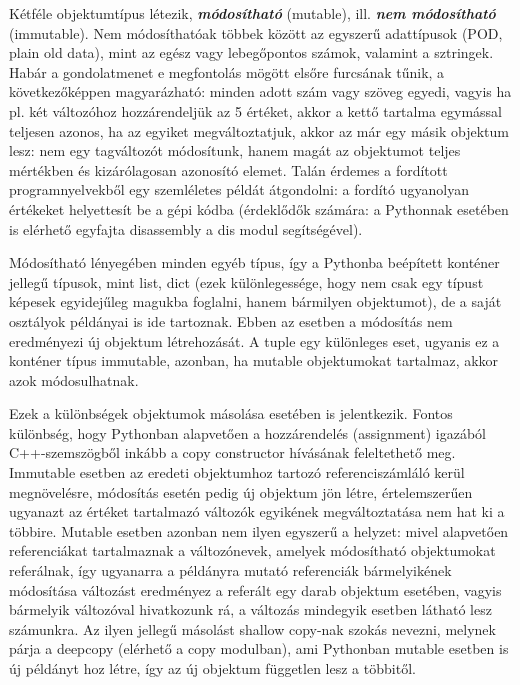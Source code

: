 \documentclass[12pt,a4paper,oneside]{report}             %
\begin{document}
Kétféle objektumtípus létezik, \textbf{\textit{módosítható}} (mutable), ill. \textbf{\textit{nem módosítható}} (immutable). Nem módosíthatóak többek között az egyszerű adattípusok (POD, plain old data), mint az egész vagy lebegőpontos számok, valamint a sztringek. Habár a gondolatmenet e megfontolás mögött elsőre furcsának tűnik, a következőképpen magyarázható: minden adott szám vagy szöveg egyedi, vagyis ha pl. két változóhoz hozzárendeljük az 5 értéket, akkor a kettő tartalma egymással teljesen azonos, ha az egyiket megváltoztatjuk, akkor az már egy másik objektum lesz: nem egy tagváltozót módosítunk, hanem magát az objektumot teljes mértékben és kizárólagosan azonosító elemet. Talán érdemes a fordított programnyelvekből egy szemléletes példát átgondolni: a fordító ugyanolyan értékeket helyettesít be a gépi kódba (érdeklődők számára: a Pythonnak esetében is elérhető egyfajta disassembly a dis modul segítségével).

Módosítható lényegében minden egyéb típus, így a Pythonba beépített konténer jellegű típusok, mint list, dict (ezek különlegessége, hogy nem csak egy típust képesek egyidejűleg magukba foglalni, hanem bármilyen objektumot), de a saját osztályok példányai is ide tartoznak. Ebben az esetben a módosítás nem eredményezi új objektum létrehozását. A tuple egy különleges eset, ugyanis ez a konténer típus immutable, azonban, ha mutable objektumokat tartalmaz, akkor azok módosulhatnak.

Ezek a különbségek objektumok másolása esetében is jelentkezik. Fontos különbség, hogy Pythonban alapvetően a hozzárendelés (assignment) igazából C++-szemszögből inkább a copy constructor hívásának feleltethető meg. Immutable esetben az eredeti objektumhoz tartozó referenciszámláló kerül megnövelésre, módosítás esetén pedig új objektum jön létre, értelemszerűen ugyanazt az értéket tartalmazó változók egyikének megváltoztatása nem hat ki a többire. Mutable esetben azonban nem ilyen egyszerű a helyzet: mivel alapvetően referenciákat tartalmaznak a változónevek, amelyek módosítható objektumokat referálnak, így ugyanarra a példányra mutató referenciák bármelyikének módosítása változást eredményez a referált egy darab objektum esetében, vagyis bármelyik változóval hivatkozunk rá, a változás mindegyik esetben látható lesz számunkra. Az ilyen jellegű másolást shallow copy-nak szokás nevezni, melynek párja a deepcopy (elérhető a copy modulban), ami Pythonban mutable esetben is új példányt hoz létre, így az új objektum független lesz a többitől.
\end{document}
